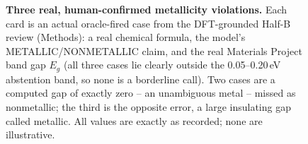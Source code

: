 \begin{figure}[t]
\caption{\textbf{Three real, human-confirmed metallicity violations.} Each card is an
actual oracle-fired case from the DFT-grounded Half-B review (Methods): a real chemical
formula, the model's METALLIC/NONMETALLIC claim, and the real Materials Project band gap
$E_g$ (all three cases lie clearly outside the 0.05--0.20\,eV abstention band, so none is a
borderline call). Two cases are a computed gap of exactly zero -- an unambiguous metal --
missed as nonmetallic; the third is the opposite error, a large insulating gap called
metallic. All values are exactly as recorded; none are illustrative.}
\label{fig:metallicity-cases}
\end{figure}

